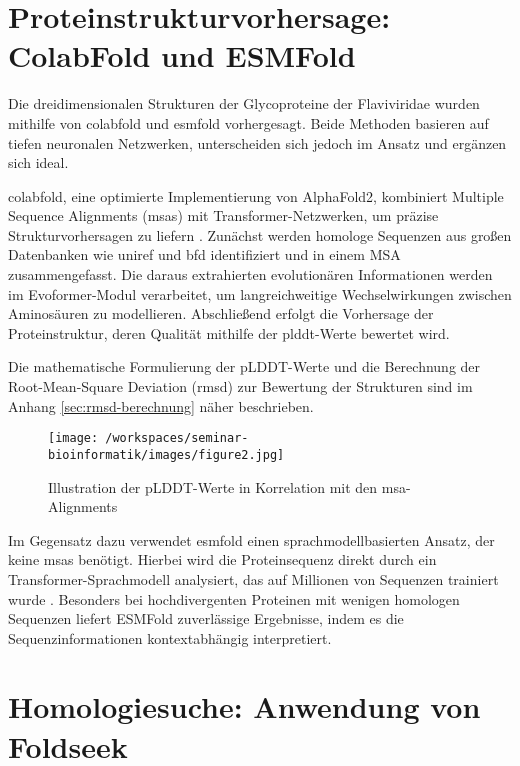 \section{Proteinstrukturvorhersage: ColabFold und ESMFold} \label{sec:colabfold-esmfold}

Die dreidimensionalen Strukturen der Glycoproteine der Flaviviridae wurden mithilfe von \gls{colabfold} und \gls{esmfold} vorhergesagt. Beide Methoden basieren auf tiefen neuronalen Netzwerken, unterscheiden sich jedoch im Ansatz und ergänzen sich ideal.

\gls{colabfold}, eine optimierte Implementierung von AlphaFold2, kombiniert Multiple Sequence Alignments (\glspl{msa}) mit Transformer-Netzwerken, um präzise Strukturvorhersagen zu liefern \autocite{Mirdita2022}. Zunächst werden homologe Sequenzen aus großen Datenbanken wie \gls{uniref} und \gls{bfd} identifiziert und in einem MSA zusammengefasst. Die daraus extrahierten evolutionären Informationen werden im Evoformer-Modul verarbeitet, um langreichweitige Wechselwirkungen zwischen Aminosäuren zu modellieren. Abschließend erfolgt die Vorhersage der Proteinstruktur, deren Qualität mithilfe der \gls{plddt}-Werte bewertet wird.

Die mathematische Formulierung der pLDDT-Werte und die Berechnung der Root-Mean-Square Deviation (\gls{rmsd}) zur Bewertung der Strukturen sind im Anhang \ref{sec:rmsd-berechnung} näher beschrieben.

\begin{figure}[H]
    \centering
    \texttt{[image: /workspaces/seminar-bioinformatik/images/figure2.jpg]}
    \caption{Illustration der pLDDT-Werte in Korrelation mit den \gls{msa}-Alignments}
    \label{fig:figure2-orginal}
\end{figure}

Im Gegensatz dazu verwendet \gls{esmfold} einen sprachmodellbasierten Ansatz, der keine \glspl{msa} benötigt. Hierbei wird die Proteinsequenz direkt durch ein Transformer-Sprachmodell analysiert, das auf Millionen von Sequenzen trainiert wurde \autocite{linEvolutionaryscalePredictionAtomiclevel2023}. Besonders bei hochdivergenten Proteinen mit wenigen homologen Sequenzen liefert ESMFold zuverlässige Ergebnisse, indem es die Sequenzinformationen kontextabhängig interpretiert.

\section{Homologiesuche: Anwendung von Foldseek} \label{sec:foldseek}

